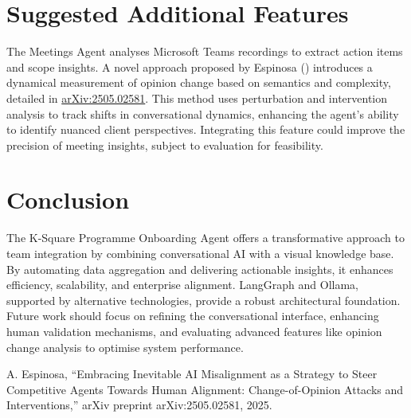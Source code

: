 \documentclass{article}
\begin{document}
\section{Suggested Additional Features}
The Meetings Agent analyses Microsoft Teams recordings to extract action items and scope insights. A novel approach proposed by Espinosa (\cite{espinosa2025}) introduces a dynamical measurement of opinion change based on semantics and complexity, detailed in \href{https://arxiv.org/abs/2505.02581}{arXiv:2505.02581}. This method uses perturbation and intervention analysis to track shifts in conversational dynamics, enhancing the agent’s ability to identify nuanced client perspectives. Integrating this feature could improve the precision of meeting insights, subject to evaluation for feasibility.

\section{Conclusion}
The K-Square Programme Onboarding Agent offers a transformative approach to team integration by combining conversational AI with a visual knowledge base. By automating data aggregation and delivering actionable insights, it enhances efficiency, scalability, and enterprise alignment. LangGraph and Ollama, supported by alternative technologies, provide a robust architectural foundation. Future work should focus on refining the conversational interface, enhancing human validation mechanisms, and evaluating advanced features like opinion change analysis to optimise system performance.

\begin{thebibliography}{1}
A. Espinosa, ``Embracing Inevitable AI Misalignment as a Strategy to Steer Competitive Agents Towards Human Alignment: Change-of-Opinion Attacks and Interventions,'' arXiv preprint arXiv:2505.02581, 2025.
\end{thebibliography}

\end{document}
